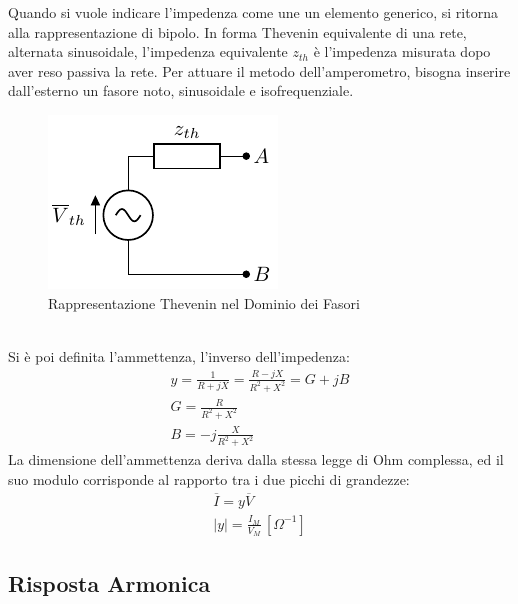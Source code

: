 \documentclass{article}
\numberwithin{equation}{subsection}
\begin{document}
Quando si vuole indicare l'impedenza come une un elemento generico, si ritorna alla rappresentazione di bipolo. In forma Thevenin equivalente di una rete, alternata 
sinusoidale, l'impedenza equivalente $z_{th}$ è l'impedenza misurata dopo aver reso passiva la rete. Per attuare il metodo dell'amperometro, bisogna inserire dall'esterno un 
fasore noto, sinusoidale e isofrequenziale. 
\begin{figure}[ht]%
    \centering
    \includegraphics{rappresentazione-thevenin-fasori.pdf}
    \caption{Rappresentazione Thevenin nel Dominio dei Fasori}
    \label{fig:rappresentazione-thevenin-fasori}
\end{figure}
\\
Si è poi definita l'ammettenza, l'inverso dell'impedenza:
\begin{gather*}
    y=\displaystyle\frac{1}{R+jX}=\frac{R-jX}{R^2+X^2}=G+jB\\
    G=\displaystyle\frac{R}{R^2+X^2}\\
    B=-j\displaystyle\frac{X}{R^2+X^2}
\end{gather*}
La dimensione dell'ammettenza deriva dalla stessa legge di Ohm complessa, ed il suo modulo corrisponde al rapporto tra i due picchi di grandezze:
\begin{gather*}
    \overline{I}=y\overline{V}\\
    |y|=\displaystyle\frac{I_M}{V_M}\,[\Omega^{-1}]
\end{gather*}

\subsection{Risposta Armonica}
\end{document}
